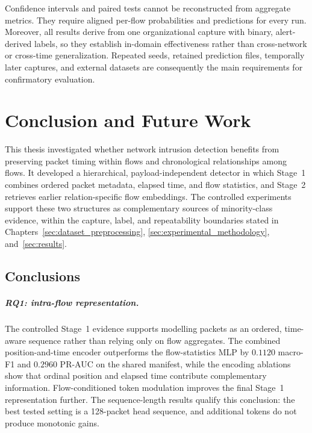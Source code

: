 \documentclass[11pt,fleqn]{report}
\begin{document}
Confidence intervals and paired tests cannot be reconstructed from aggregate
metrics. They require aligned per-flow probabilities and predictions for every
run. Moreover, all results derive from one organizational capture with binary,
alert-derived labels, so they establish in-domain effectiveness rather than
cross-network or cross-time generalization. Repeated seeds, retained prediction
files, temporally later captures, and external datasets are consequently the
main requirements for confirmatory evaluation.

\chapter{Conclusion and Future Work}
\label{sec:conclusion_future_work}

This thesis investigated whether network intrusion detection benefits from
preserving packet timing within flows and chronological relationships among
flows. It developed a hierarchical, payload-independent detector in which
Stage~1 combines ordered packet metadata, elapsed time, and flow statistics,
and Stage~2 retrieves earlier relation-specific flow embeddings. The controlled
experiments support these two structures as complementary sources of
minority-class evidence, within the capture, label, and repeatability boundaries
stated in Chapters~\ref{sec:dataset_preprocessing},
\ref{sec:experimental_methodology}, and~\ref{sec:results}.

\section{Conclusions}
\label{subsec:conclusion_rq_answers}

\paragraph{RQ1: intra-flow representation.}
The controlled Stage~1 evidence supports modelling packets as an ordered,
time-aware sequence rather than relying only on flow aggregates. The combined
position-and-time encoder outperforms the flow-statistics MLP by $0.1120$
macro-F1 and $0.2960$ PR-AUC on the shared manifest, while the encoding
ablations show that ordinal position and elapsed time contribute complementary
information. Flow-conditioned token modulation improves the final Stage~1
representation further. The sequence-length results qualify this conclusion:
the best tested setting is a 128-packet head sequence, and additional tokens do
not produce monotonic gains.
\end{document}
